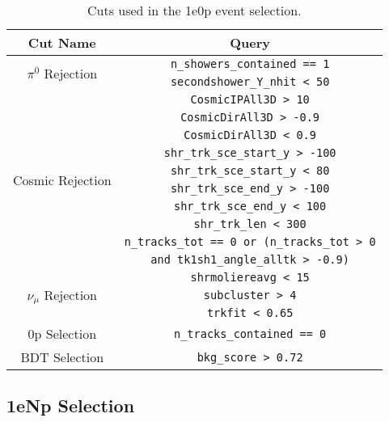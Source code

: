 \renewcommand{\arraystretch}{1.4}
\begin{table}[H]
    \centering
    \begin{tabular}{c|c}
        \hline
        \hline
        Cut Name & Query \\
        \hline
        \hline
        \multirow{2}{*}{$\pi^0$ Rejection} & \verb|n_showers_contained == 1| \\
        & \verb|secondshower_Y_nhit < 50| \\
        \hline
        \multirow{10}{*}{Cosmic Rejection} & \verb|CosmicIPAll3D > 10| \\
        & \verb|CosmicDirAll3D > -0.9| \\
        & \verb|CosmicDirAll3D < 0.9| \\
        & \verb|shr_trk_sce_start_y > -100| \\
        & \verb|shr_trk_sce_start_y < 80| \\
        & \verb|shr_trk_sce_end_y > -100| \\
        & \verb|shr_trk_sce_end_y < 100| \\
        & \verb|shr_trk_len < 300| \\
        & \verb|n_tracks_tot == 0 or (n_tracks_tot > 0| \\
        & \verb|and tk1sh1_angle_alltk > -0.9)| \\
        \hline
        \multirow{3}{*}{$\nu_{\mu}$ Rejection} & \verb|shrmoliereavg < 15| \\
        & \verb|subcluster > 4| \\
        & \verb|trkfit < 0.65| \\
        \hline
        0p Selection & \verb|n_tracks_contained == 0| \\
        \hline
        BDT Selection & \verb|bkg_score > 0.72| \\ 
        \hline
        \end{tabular}
    \caption{Cuts used in the 1e0p event selection.}
    \label{tab:1e0pSel}    
\end{table}
\renewcommand{\arraystretch}{1.0}

\subsection{1eNp Selection}
\label{appendix:1eNpSelection}

